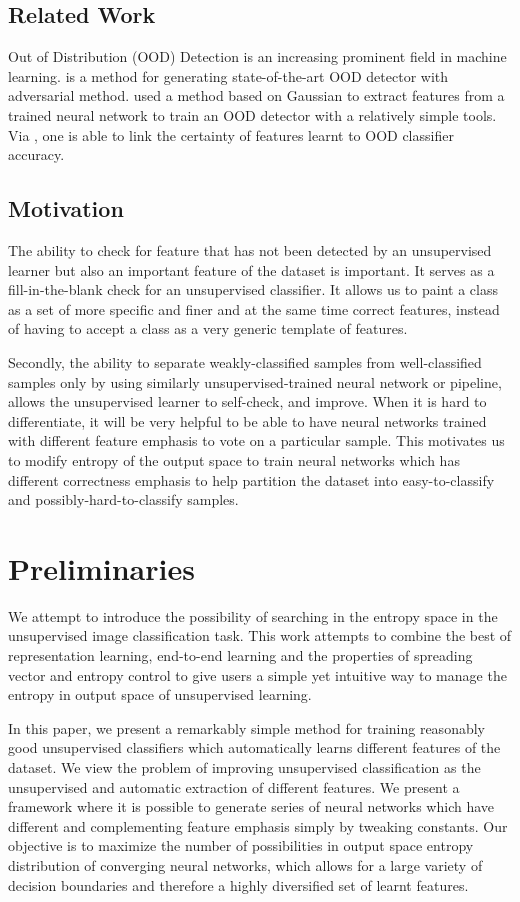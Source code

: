 \documentclass[10pt,twocolumn,letterpaper]{article}
\begin{document}
\subsection{Related Work}
Out of Distribution (OOD) Detection is an increasing prominent field in machine learning. \cite{pidhorskyi2018generative} is a method for generating state-of-the-art OOD detector with adversarial method. \cite{lee2018simple} used a method based on Gaussian to extract features from a trained neural network to train an OOD detector with a relatively simple tools. Via \cite{lee2018simple}, one is able to link the certainty of features learnt to OOD classifier accuracy. 

\subsection{Motivation}
The ability to check for feature that has not been detected by an unsupervised learner but also an important feature of the dataset is important. It serves as a fill-in-the-blank check for an unsupervised classifier. It allows us to paint a class as a set of more specific and finer and at the same time correct features, instead of having to accept a class as a very generic template of features.

Secondly, the ability to separate weakly-classified samples from well-classified samples only by using similarly unsupervised-trained neural network or pipeline, allows the unsupervised learner to self-check, and improve. When it is hard to differentiate, it will be very helpful to be able to have neural networks trained with different feature emphasis to vote on a particular sample. This motivates us to modify entropy of the output space to train neural networks which has different correctness emphasis to help partition the dataset into easy-to-classify and possibly-hard-to-classify samples. 

\section{Preliminaries}
We attempt to introduce the possibility of searching in the entropy space in the unsupervised image classification task. This work attempts to combine the best of representation learning, end-to-end learning and the properties of spreading vector and entropy control to give users a simple yet intuitive way to manage the entropy in output space of unsupervised learning. 

In this paper, we present a remarkably simple method for training reasonably good unsupervised classifiers which automatically learns different features of the dataset. We view the problem of improving unsupervised classification as the unsupervised and automatic extraction of different features. We present a framework where it is possible to generate series of neural networks which have different and complementing feature emphasis simply by tweaking constants. Our objective is to maximize the number of possibilities in output space entropy distribution of converging neural networks, which allows for a large variety of decision boundaries and therefore a highly diversified set of learnt features. 
\end{document}
